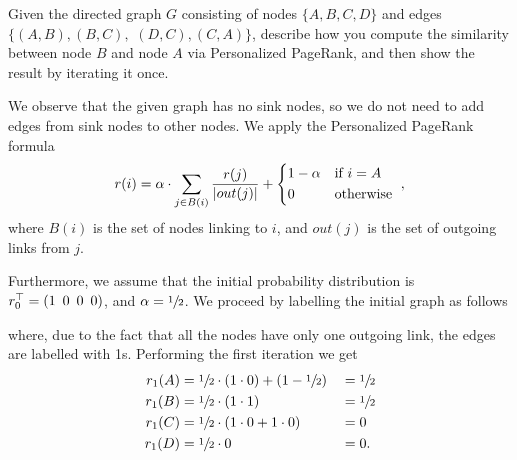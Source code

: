 \exercise

Given the directed graph $G$ consisting of nodes $\{A, B, C, D\}$ and edges 
$\{(A,B), (B,C),$ $ (D,C), (C,A)\}$, describe how you compute the similarity
between node $B$ and node $A$ via Personalized PageRank, and then show the
result by iterating it once.

\solution

We observe that the given graph has no sink nodes, so we do not need to add
edges from sink nodes to other nodes. We apply the Personalized PageRank formula
%
\begin{equation*}
  r(i) = \alpha\cdot\sum_{j\in B(i)} \frac{r(j)}{|out(j)|} +
  \begin{cases*}
    1-\alpha & if $i=A$ \\
    0        & otherwise
  \end{cases*},
\end{equation*}
%
where $B(i)$ is the set of nodes linking to $i$, and $out(j)$ is the set of
outgoing links from $j$.

Furthermore, we assume that the initial probability distribution is
$r_0^\top=(1 \enskip 0 \enskip 0 \enskip 0)$, and $\alpha=\sfrac{1}{2}$. We
proceed by labelling the initial graph as follows
%
\begin{center}
\end{center}
%
where, due to the fact that all the nodes have only one outgoing link, the edges
are labelled with 1s. Performing the first iteration we get
%
\begin{alignat*}{3}
  r_1(A) &= \sfrac{1}{2} \cdot (1\cdot0) + (1-\sfrac{1}{2}) &&= \sfrac{1}{2} \\
  r_1(B) &= \sfrac{1}{2} \cdot (1\cdot1)                    &&= \sfrac{1}{2} \\
  r_1(C) &= \sfrac{1}{2} \cdot (1\cdot0+1\cdot0)            && = 0 \\
  r_1(D) &= \sfrac{1}{2} \cdot 0                            &&= 0.
\end{alignat*}

